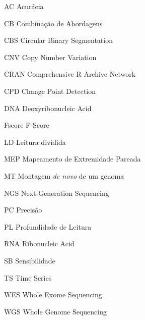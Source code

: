 
\begin{siglas}
    \item[AC] Acurácia
    \item[CB] Combinação de Abordagens
    \item[CBS] Circular Binary Segmentation
    \item[CNV] Copy Number Variation
    \item[CRAN] Comprehensive R Archive Network
    \item[CPD] Change Point Detection
    \item[DNA] Deoxyribonucleic Acid
    \item[Fscore] F-Score
    \item[LD] Leitura dividida
    \item[MEP] Mapeamento de Extremidade Pareada
    \item[MT] Montagem \textit{de novo} de um genoma
    \item[NGS] Next-Generation Sequencing
    \item[PC] Precisão
    \item[PL] Profundidade de Leitura
    \item[RNA] Ribonucleic Acid
    \item[SB] Sensibilidade
    \item[TS] Time Series
    \item[WES] Whole Exome Sequencing
    \item[WGS] Whole Genome Sequencing
\end{siglas}

